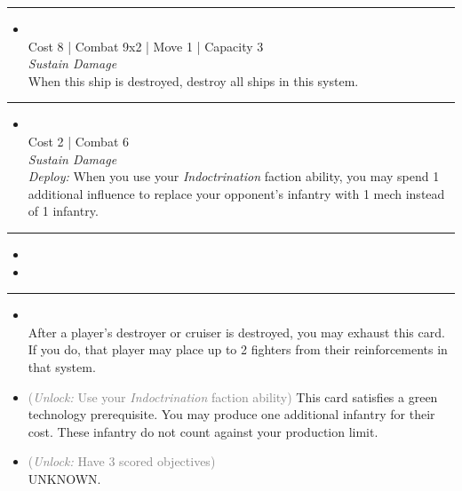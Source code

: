 \begin{multicols}{2}
\vspace{-10pt}\rule{\hsize}{0.4pt}\vspace{5pt}


\begin{itemize}
\item {}\\
Cost 8 | Combat 9x2 | Move 1 | Capacity 3 \\
\emph{Sustain Damage}\\
When this ship is destroyed, destroy all ships in this system.
\end{itemize}

\vspace{-10pt}\rule{\hsize}{0.4pt}\vspace{5pt}


\begin{itemize}
\item {}\\
Cost 2 | Combat 6 \\
\emph{Sustain Damage}\\
\emph{Deploy:} When you use your \emph{Indoctrination} faction ability, you may spend 1 additional influence to replace your opponent's infantry with 1 mech instead of 1 infantry. 
\end{itemize}

\vspace{-10pt}\rule{\hsize}{0.4pt}\vspace{5pt}

\nounits

\columnbreak
{}

\begin{itemize}
\item \spinner
\item \impulseCore
\end{itemize}

\vspace{-10pt}\rule{\hsize}{0.4pt}\vspace{5pt}


\begin{itemize}
\item {}\\
After a player's destroyer or cruiser is destroyed, you may exhaust this card. If you do, that player may place up to 2 fighters from their reinforcements in that system.
\item {} \textcolor{gray}{(\emph{Unlock:} Use your \emph{Indoctrination} faction ability)}
This card satisfies a green technology prerequisite. You may produce one additional infantry for their cost. These infantry do not count against your production limit.
\item {} \textcolor{gray}{(\emph{Unlock:} Have 3 scored objectives)}\\
UNKNOWN.
\end{itemize}


\end{multicols}
